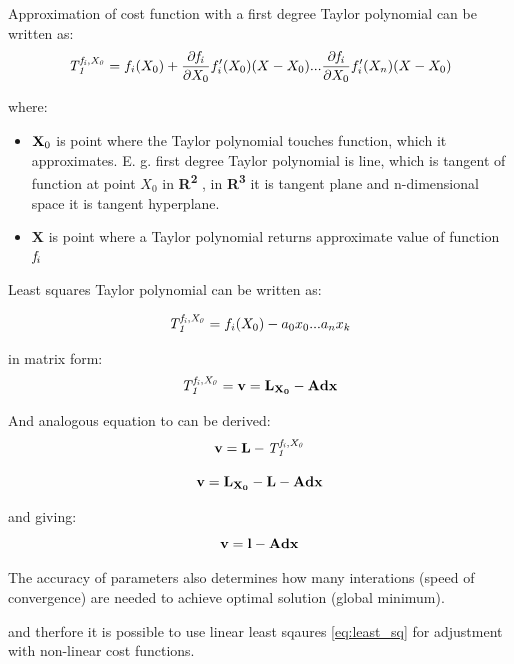 \documentclass[a4paper,12pt]{report}
\newcommand{\ematr}[1]{
{\bf #1}
}
\newcommand{\evect}[1]{
{\bf #1}
}
\newcommand{\eucl}[1]{
{\bf R\textsuperscript{#1}}
}
\newcommand{\efunc}[1]{
{\it #1}
}
\begin{document}
Approximation of cost function with a first degree Taylor polynomial can be written as:
\begin{equation}
\efunc{T^{f_{i}, X_{0}}_{1}} = f_{i}(X_{0}) + \frac{\partial \efunc{f_{i}}}{\partial {X_{0}}} f_{i}'(X_{0}) (X -  X_{0}) 
... \frac{\partial \efunc{f_{i}}}{\partial {X_{0}}} f_{i}'(X_{n}) (X -  X_{0}) 
\end{equation}

where:
\begin{itemize}
\item $\evect{X}_{0}$ is point where the Taylor polynomial touches function, which it approximates. E. g. first degree Taylor polynomial 
      is line, which is tangent of function at point $X_{0}$ in \eucl{2}, in \eucl{3} it is tangent plane and n-dimensional 
      space it is tangent hyperplane.
\item \evect{X} is point where a Taylor polynomial returns approximate value of function $\efunc{f}_{i}$
\end{itemize}


Least squares Taylor polynomial can be written as:

\begin{equation}
\efunc{T^{f_{i}, X_{0}}_{1}} = f_{i}(X_{0}) - a_{0} x_{0} ... a_{n} x_{k} 
\end{equation} 

in matrix form:
\begin{equation}
\efunc{T^{f_{i}, X_{0}}_{1}} = \evect{v} = \evect{L_{X_{0}}} - \ematr{A}\evect{dx}
\end{equation} 

And analogous equation to \label{eq:least_v} can be derived:
\begin{equation}
\evect{v} = \evect{L} - \efunc{T^{f_{i}, X_{0}}_{1}}
\end{equation} 

\begin{equation}
\evect{v} =  \evect{L_{X_{0}}} - \evect{L} - \ematr{A}\evect{dx}
\end{equation} 

and giving:
\begin{equation}
\evect{v} = \evect{l} - \ematr{A}\evect{dx}
\end{equation} 

The accuracy of parameters also determines how many interations (speed of convergence) are needed to achieve optimal solution (global minimum).


and therfore it is possible to use linear least sqaures \eqref{eq:least_sq} for adjustment 
with non-linear cost functions.
\end{document}
